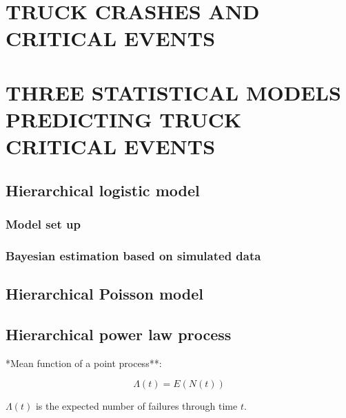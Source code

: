 \documentclass[12pt]{book}
\numberwithin{equation}{chapter}
\begin{document}
\hypertarget{truck-crashes-and-critical-events}{%
\chapter{TRUCK CRASHES AND CRITICAL EVENTS}\label{truck-crashes-and-critical-events}}

\hypertarget{three-statistical-models-predicting-truck-critical-events}{%
\chapter{THREE STATISTICAL MODELS PREDICTING TRUCK CRITICAL EVENTS}\label{three-statistical-models-predicting-truck-critical-events}}

\hypertarget{hierarchical-logistic-model}{%
\section{Hierarchical logistic model}\label{hierarchical-logistic-model}}

\hypertarget{model-set-up}{%
\subsection{Model set up}\label{model-set-up}}

\hypertarget{bayesian-estimation-based-on-simulated-data}{%
\subsection{Bayesian estimation based on simulated data}\label{bayesian-estimation-based-on-simulated-data}}

\hypertarget{hierarchical-poisson-model}{%
\section{Hierarchical Poisson model}\label{hierarchical-poisson-model}}

\hypertarget{hierarchical-power-law-process}{%
\section{Hierarchical power law process}\label{hierarchical-power-law-process}}

*Mean function of a point process**:

\[\Lambda(t) = E(N(t))\]

\(\Lambda(t)\) is the expected number of failures through time \(t\).
\end{document}
